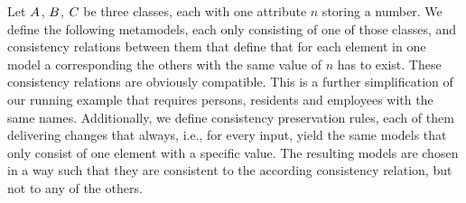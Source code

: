 Let $A_{}$, $B_{}$, $C_{}$ be three classes, each with one attribute $n$ storing a number.
We define the following metamodels, each only consisting of one of those classes, and consistency relations between them that define that for each element in one model a corresponding the others with the same value of $n$ has to exist.
These consistency relations are obviously compatible.
This is a further simplification of our running example that requires persons, residents and employees with the same names.
Additionally, we define consistency preservation rules, each of them delivering changes that always, i.e., for every input, yield the same models that only consist of one element with a specific value.
The resulting models are chosen in a way such that they are consistent to the according consistency relation, but not to any of the others.
